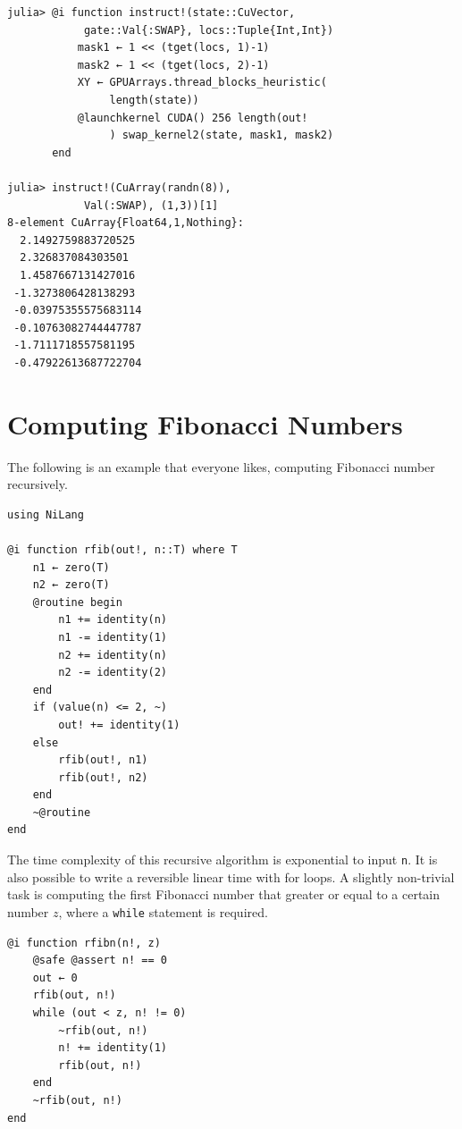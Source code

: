 \documentclass[aps,twocolumn,longbibliography,english,superscriptaddress]{revtex4-1}
\newcommand{\<}{\langle}
\renewcommand{\>}{\rangle}
\theoremstyle{definition}\newtheorem{definition}{\textit{Definition}}
\begin{document}
\begin{minipage}{.44\textwidth}
\begin{lstlisting}
julia> @i function instruct!(state::CuVector,
            gate::Val{:SWAP}, locs::Tuple{Int,Int})
           mask1 ← 1 << (tget(locs, 1)-1)
           mask2 ← 1 << (tget(locs, 2)-1)
           XY ← GPUArrays.thread_blocks_heuristic(
                length(state))
           @launchkernel CUDA() 256 length(out!
                ) swap_kernel2(state, mask1, mask2)
       end

julia> instruct!(CuArray(randn(8)),
            Val(:SWAP), (1,3))[1]
8-element CuArray{Float64,1,Nothing}:
  2.1492759883720525 
  2.326837084303501  
  1.4587667131427016 
 -1.3273806428138293 
 -0.03975355575683114
 -0.10763082744447787
 -1.7111718557581195 
 -0.47922613687722704
\end{lstlisting}
\end{minipage}


\section{Computing Fibonacci Numbers}\label{app:fib}
The following is an example that everyone likes, computing Fibonacci number recursively.

\begin{minipage}{.44\textwidth}
    \begin{lstlisting}
using NiLang

@i function rfib(out!, n::T) where T
    n1 ← zero(T)
    n2 ← zero(T)
    @routine begin
        n1 += identity(n)
        n1 -= identity(1)
        n2 += identity(n)
        n2 -= identity(2)
    end
    if (value(n) <= 2, ~)
        out! += identity(1)
    else
        rfib(out!, n1)
        rfib(out!, n2)
    end
    ~@routine
end
\end{lstlisting}
\end{minipage}

The time complexity of this recursive algorithm is exponential to input \texttt{n}. It is also possible to write a reversible linear time with for loops.
A slightly non-trivial task is computing the first Fibonacci number that greater or equal to a certain number $z$, where a \texttt{while} statement is required.

\begin{minipage}{.44\textwidth}
\begin{lstlisting}
@i function rfibn(n!, z)
    @safe @assert n! == 0
    out ← 0
    rfib(out, n!)
    while (out < z, n! != 0)
        ~rfib(out, n!)
        n! += identity(1)
        rfib(out, n!)
    end
    ~rfib(out, n!)
end
\end{lstlisting}
\end{minipage}
\end{document}
